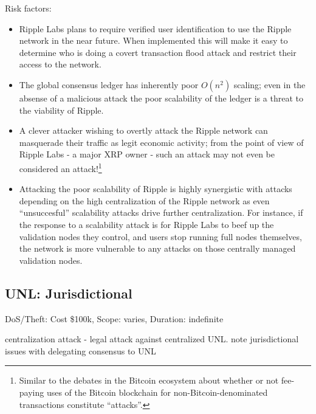 \documentclass{article}
\begin{document}
Risk factors:

\begin{itemize}

    \item Ripple Labs plans\cite{cointelegraph-ripple-aml} to require verified
        user identification to use the Ripple network in the near future.  When
        implemented this will make it easy to determine who is doing a covert
        transaction flood attack and restrict their access to the network.

    \item The global consensus ledger has inherently poor $O(n^2)$ scaling;
        even in the absense of a malicious attack the poor scalability of the
        ledger is a threat to the viability of Ripple.

    \item A clever attacker wishing to overtly attack the Ripple network can
        masquerade their traffic as legit economic activity; from the point of
        view of Ripple Labs - a major XRP owner - such an attack may not even
        be considered an attack!\footnote{Similar to the debates in the Bitcoin
        ecosystem about whether or not fee-paying uses of the Bitcoin
        blockchain for non-Bitcoin-denominated transactions constitute
        ``attacks''.}

    \item Attacking the poor scalability of Ripple is highly synergistic with
        attacks depending on the high centralization of the Ripple network as
        even ``unsuccesful'' scalability attacks drive further centralization.
        For instance, if the response to a scalability attack is for Ripple
        Labs to beef up the validation nodes they control, and users stop
        running full nodes themselves, the network is more vulnerable to any
        attacks on those centrally managed validation nodes.

\end{itemize}




\subsection{UNL: Jurisdictional}

DoS/Theft: Cost \$100k, Scope: varies, Duration: indefinite

centralization attack - legal attack against centralized UNL. note
jurisdictional issues with delegating consensus to UNL
\end{document}
